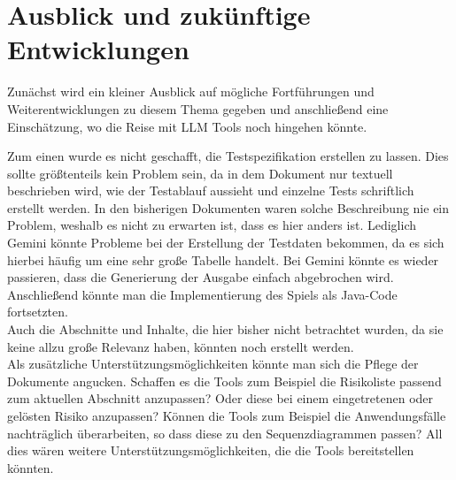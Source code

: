 \section{Ausblick und zukünftige Entwicklungen}  \label{Ausblick und zukünftige Entwicklungen}

Zunächst wird ein kleiner Ausblick auf mögliche Fortführungen und Weiterentwicklungen zu diesem Thema gegeben und anschließend 
eine Einschätzung, wo die Reise mit LLM Tools noch hingehen könnte.

Zum einen wurde es nicht geschafft, die Testspezifikation erstellen zu lassen. Dies sollte größtenteils kein Problem sein, da 
in dem Dokument nur textuell beschrieben wird, wie der Testablauf aussieht und einzelne Tests schriftlich erstellt werden. 
In den bisherigen Dokumenten waren solche Beschreibung nie ein Problem, weshalb es nicht zu erwarten ist, dass es hier anders ist.
Lediglich Gemini könnte Probleme bei der Erstellung der Testdaten bekommen, da es sich hierbei häufig um eine sehr große Tabelle handelt.
Bei Gemini könnte es wieder passieren, dass die Generierung der Ausgabe einfach abgebrochen wird.\\
Anschließend könnte man die Implementierung des Spiels als Java-Code fortsetzten.\\
Auch die Abschnitte und Inhalte, die hier bisher nicht betrachtet wurden, da sie keine allzu große Relevanz haben, könnten noch 
erstellt werden.\\
Als zusätzliche Unterstützungsmöglichkeiten könnte man sich die Pflege der Dokumente angucken. Schaffen es die Tools zum Beispiel 
die Risikoliste passend zum aktuellen Abschnitt anzupassen? Oder diese bei einem eingetretenen oder gelösten Risiko anzupassen? Können 
die Tools zum Beispiel die Anwendungsfälle nachträglich überarbeiten, so dass diese zu den Sequenzdiagrammen passen? All dies wären weitere 
Unterstützungsmöglichkeiten, die die Tools bereitstellen könnten.

